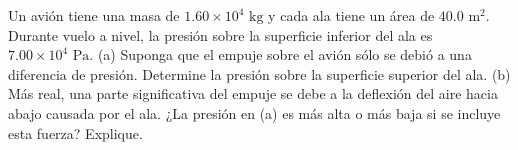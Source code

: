 \item Un avión tiene una masa de $1.60 \times 10^4 \text{ kg}$ y cada ala tiene un área de $40.0 \text{ m}^2$. Durante vuelo a nivel, la presión sobre la superficie inferior del ala es $7.00 \times 10^4 \text{ Pa}$. (a) Suponga que el empuje sobre el avión sólo se debió a una diferencia de presión. Determine la presión sobre la superficie superior del ala. (b) Más real, una parte significativa del empuje se debe a la deflexión del aire hacia abajo causada por el ala. ¿La presión en (a) es más alta o más baja si se incluye esta fuerza? Explique.
